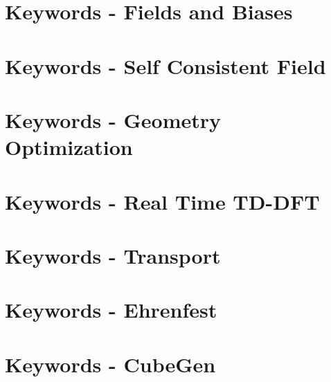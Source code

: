 \section{Keywords - Fields and Biases}


\newpage
\section{Keywords - Self Consistent Field}


\newpage
\section{Keywords - Geometry Optimization}


\newpage
\section{Keywords - Real Time TD-DFT}


\newpage
\section{Keywords - Transport}


\newpage
\section{Keywords - Ehrenfest}


\newpage
\section{Keywords - CubeGen}


\newpage
